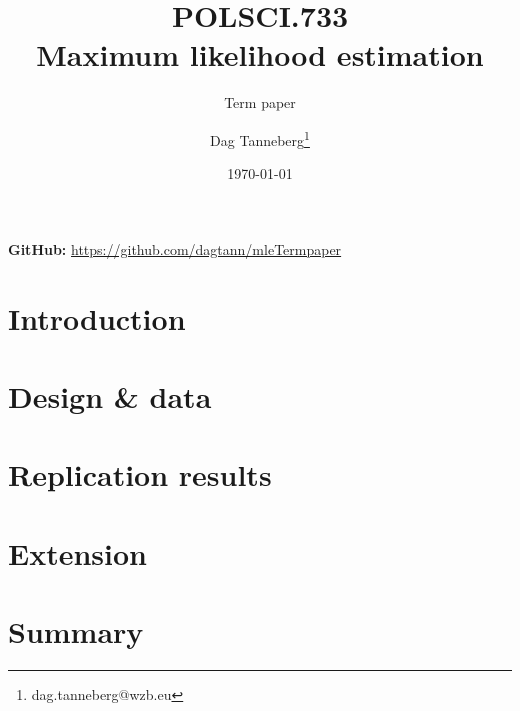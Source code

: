 \documentclass[parskip=half]{scrartcl}\usepackage[]{graphicx}\usepackage[]{color}
\title{POLSCI.733\\Maximum likelihood estimation}
\subtitle{Term paper}
\author{Dag Tanneberg\thanks{%
    dag.tanneberg@wzb.eu
  }
}
\date{\today}
\begin{document}
 

\maketitle
\thispagestyle{empty}
\tableofcontents

\begin{center}
  \textbf{GitHub:} \url{https://github.com/dagtann/mleTermpaper}
\end{center}
\newpage

\section{Introduction}








\section{Design \& data}






\section{Replication results}
%
%




\section{Extension}



\section{Summary}

\end{document}
